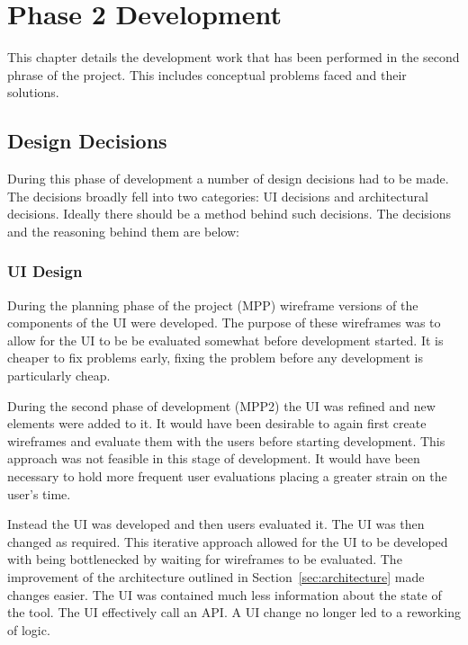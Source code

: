 \chapter{Phase 2 Development}
\label{chap:work}

This chapter details the development work that has been performed in the second phrase of the project.  This includes conceptual problems faced and their solutions.


\section{Design Decisions}

During this phase of development a number of design decisions had to be made.  The decisions broadly fell into two categories:  \ac{UI} decisions and architectural decisions.  Ideally there should be a method behind such decisions.  The decisions and the reasoning behind them are below:

\subsection{\ac{UI} Design}

During the planning phase of the project (MPP) wireframe versions of the components of the \ac{UI} were developed.  The purpose of these wireframes was to allow for the \ac{UI} to be be evaluated somewhat before development started.  It is cheaper to fix problems early, fixing the problem before any development is particularly cheap.

During the second phase of development (MPP2) the \ac{UI} was refined and new elements were added to it.  It would have been desirable to again first create wireframes and evaluate them with the users before starting development.  This approach was not feasible in this stage of development.  It would have been necessary to hold more frequent user evaluations placing a greater strain on the user's time.

Instead the \ac{UI} was developed and then users evaluated it.  The \ac{UI} was then changed as required.  This iterative approach allowed for the \ac{UI} to be developed with being bottlenecked by waiting for wireframes to be  evaluated.  The improvement of the architecture outlined in Section~\ref{sec:architecture} made changes easier.  The \ac{UI} was contained much less information about the state of the tool.  The \ac{UI} effectively call an \ac{API}.  A \ac{UI} change no longer led to a reworking of logic.

